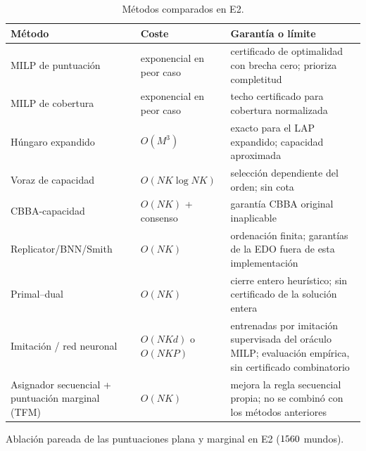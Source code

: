 \begin{table}[!htbp]
  \centering
  \caption{Métodos comparados en E2.}
  \label{tab:sp1-compact-e2-methods}
  \fontsize{7.6}{8.6}\selectfont
  \setlength{\tabcolsep}{2.2pt}
  \renewcommand{\arraystretch}{1.08}
  \begin{tabularx}{\textwidth}{>{\raggedright\arraybackslash}p{2.6cm} >{\raggedright\arraybackslash}p{1.9cm} Y}
    \toprule
    Método & Coste & Garantía o límite \\
    \midrule
    MILP de puntuación & exponencial en peor caso & certificado de optimalidad con brecha cero; prioriza completitud \\
    MILP de cobertura & exponencial en peor caso & techo certificado para cobertura normalizada \\
    Húngaro expandido \parencite{kuhn1955Hungarian} & $O(M^3)$ & exacto para el LAP expandido; capacidad aproximada \\
    Voraz de capacidad & $O(NK\log NK)$ & selección dependiente del orden; sin cota \\
    CBBA-capacidad \parencite{choiBrunetHow2009CBBA} & $O(NK)$ + consenso & garantía CBBA original inaplicable \\
    Replicator/BNN/Smith \parencite{sandholm2010population} & $O(NK)$ & ordenación finita; garantías de la EDO fuera de esta implementación \\
    Primal--dual & $O(NK)$ & cierre entero heurístico; sin certificado de la solución entera \\
    Imitación / red neuronal & $O(NKd)$ o $O(NKP)$ & entrenadas por imitación supervisada del oráculo MILP; evaluación empírica, sin certificado combinatorio \\
    Asignador secuencial + puntuación marginal (TFM) & $O(NK)$ & mejora la regla secuencial propia; no se combinó con los métodos anteriores \\
    \bottomrule
  \end{tabularx}
\end{table}

\begin{table}[!htbp]
  \centering
  \caption{Ablación pareada de las puntuaciones plana y marginal en E2 ($\SPTwoWorlds$ mundos).}
  \label{tab:sp1-compact-e2-ablation}
  \resizebox{0.82\textwidth}{!}{}
\end{table}

